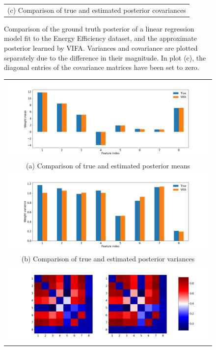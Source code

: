 \documentclass[msc,deptreport.inf]{infthesis} %
\begin{document}
\begin{figure}[!htbp]
\begin{tabular}{c}
		(c) Comparison of true and estimated posterior covariances \\[6pt] 
	\end{tabular}
	\caption{Comparison of the ground truth posterior of a linear regression model fit to the Energy Efficiency dataset, and the approximate posterior learned by VIFA. Variances and covariance are plotted separately due to the difference in their magnitude. In plot (c), the diagonal entries of the covariance matrices have been set to zero.}
	\label{fig:posterior_energy_efficiency}
\end{figure}

\begin{figure}[!htbp] 
	\begin{tabular}{c}
		\includegraphics[width=140mm]{plots/concrete_strength_posterior_mean.png} \\
		(a) Comparison of true and estimated posterior means \\[6pt] 
		 \includegraphics[width=140mm]{plots/concrete_strength_posterior_variance.png} \\
		(b) Comparison of true and estimated posterior variances \\[6pt] 
		\includegraphics[width=140mm]{plots/concrete_strength_posterior_covariance.png} \\

\end{tabular}
\end{figure}
\end{document}

